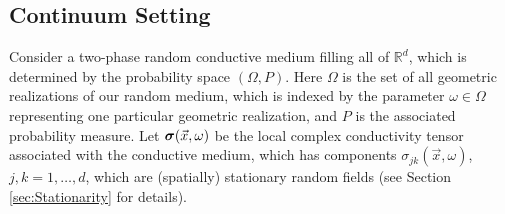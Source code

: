 \documentclass{cmslatex}
\newcommand\bsig{\mbox{\boldmath${\sigma}$}}
\begin{document}
\subsection{Continuum Setting}\label{sec:Continuum_Setting}
%
Consider a two-phase random conductive medium filling all of
$\mathbb{R}^d$, which is determined by the probability space
$(\Omega,P)$. Here $\Omega$ is the set of all  geometric realizations of our
random medium, which is indexed by the parameter $\omega\in\Omega$ representing
one particular geometric realization, and $P$ is the associated
probability measure. Let $\bsig(\vec{x},\omega)$ be the local complex
conductivity tensor associated with the conductive medium, which has 
components $\sigma_{jk}(\vec{x},\omega)$, $j,k=1,\ldots,d$, which are (spatially)
stationary random fields (see Section \ref{sec:Stationarity} for
details).  
\end{document}
